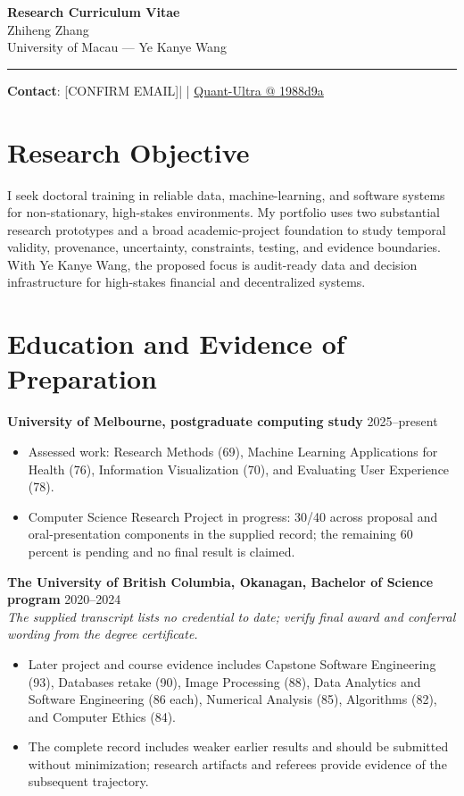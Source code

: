 \documentclass[11pt]{article}
\makeatletter
\newcommand{\ApplicantName}{Zhiheng Zhang}
\newcommand{\ApplicantEmail}{[CONFIRM EMAIL]}
\newcommand{\ApplicantPhone}{[CONFIRM PHONE]}
\newcommand{\ApplicantGitHub}{\href{https://github.com/zhiheng-zhang-Mera/Quant-Ultra/tree/1988d9a8530da91a8158de864d098ea869098923}{Quant-Ultra @ 1988d9a}}
\makeatother
\begin{document}
\begin{center}
{\LARGE\bfseries Research Curriculum Vitae}\\[0.25em]
{\large \ApplicantName}\\
University of Macau --- Ye Kanye Wang
\end{center}
\vspace{0.35em}\hrule\vspace{0.65em}

\textbf{Contact}: \ApplicantEmail\quad | \quad \ApplicantPhone\quad | \quad \ApplicantGitHub

\section*{Research Objective}
I seek doctoral training in reliable data, machine-learning, and software systems for non-stationary, high-stakes environments. My portfolio uses two substantial research prototypes and a broad academic-project foundation to study temporal validity, provenance, uncertainty, constraints, testing, and evidence boundaries. With Ye Kanye Wang, the proposed focus is audit-ready data and decision infrastructure for high-stakes financial and decentralized systems.

\section*{Education and Evidence of Preparation}
\textbf{University of Melbourne, postgraduate computing study} \hfill 2025--present
\begin{itemize}
\item Assessed work: Research Methods (69), Machine Learning Applications for Health (76), Information Visualization (70), and Evaluating User Experience (78).
\item Computer Science Research Project in progress: 30/40 across proposal and oral-presentation components in the supplied record; the remaining 60 percent is pending and no final result is claimed.
\end{itemize}

\textbf{The University of British Columbia, Okanagan, Bachelor of Science program} \hfill 2020--2024\\
\textit{The supplied transcript lists no credential to date; verify final award and conferral wording from the degree certificate.}
\begin{itemize}
\item Later project and course evidence includes Capstone Software Engineering (93), Databases retake (90), Image Processing (88), Data Analytics and Software Engineering (86 each), Numerical Analysis (85), Algorithms (82), and Computer Ethics (84).
\item The complete record includes weaker earlier results and should be submitted without minimization; research artifacts and referees provide evidence of the subsequent trajectory.
\end{itemize}
\end{document}
